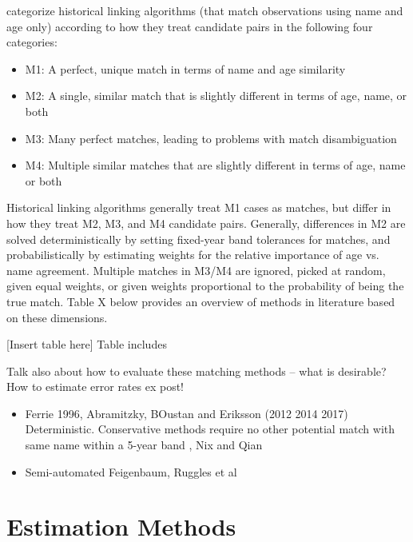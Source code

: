 \documentclass[12pt]{article}
\begin{document}
\cite{bailey2017} categorize historical linking algorithms (that match observations using name and age only) according to how they treat candidate pairs in the following four categories:
\begin{itemize}
\item M1: A perfect, unique match in terms of name and age similarity 
\item M2: A single, similar match that is slightly different in terms of age, name, or both
\item M3: Many perfect matches, leading to problems with match disambiguation
\item M4:  Multiple similar matches that are slightly different in terms of age, name or both 
\end{itemize}
Historical linking algorithms generally treat M1 cases as matches, but differ in how they treat M2, M3, and M4 candidate pairs.   Generally, differences in M2 are solved deterministically by setting fixed-year band tolerances for matches, and probabilistically by estimating weights for the relative importance of age vs. name agreement.  Multiple matches in M3/M4 are ignored, picked at random, given equal weights, or given weights proportional to the probability of being the true match.  Table X below provides an overview of methods in literature based on these dimensions. 

[Insert table here] 
Table includes 

Talk also about how to evaluate these matching methods -- what is desirable? How to estimate error rates ex post! 

\begin{itemize}
\item Ferrie 1996, Abramitzky, BOustan and Eriksson (2012 2014 2017) Deterministic.  Conservative methods require no other potential match with same name within a 5-year band , Nix and Qian
\item Semi-automated Feigenbaum, Ruggles et al 

\end{itemize}


\section{Estimation Methods}
\end{document}
